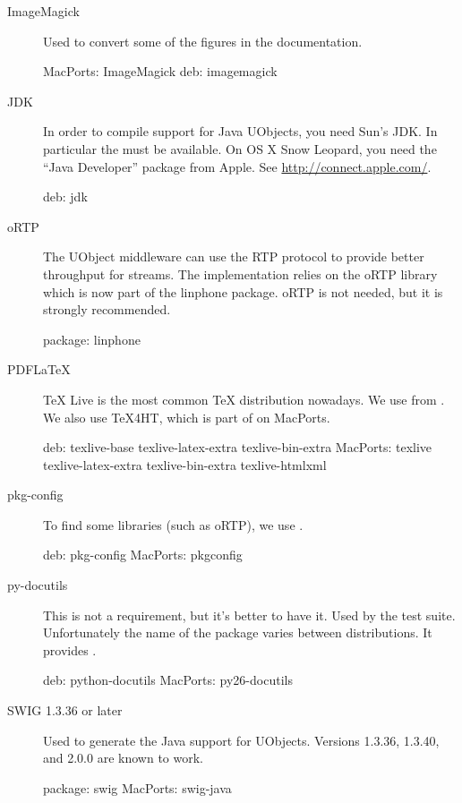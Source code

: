 \begin{description}
\item[ImageMagick] Used to convert some of the figures in the
  documentation.
\begin{package}
MacPorts: ImageMagick
deb: imagemagick
\end{package}

\item[JDK] In order to compile support for Java UObjects, you need Sun's
  JDK.  In particular the  must be available.  On OS X Snow
  Leopard, you need the ``Java Developer'' package from Apple.  See
  \url{http://connect.apple.com/}.
\begin{package}
deb: jdk
\end{package}

\item[oRTP] The UObject middleware can use the RTP protocol to provide
  better throughput for streams.  The implementation relies on the oRTP
  library which is now part of the linphone package.  oRTP is not needed,
  but it is strongly recommended.
\begin{package}
package: linphone
\end{package}

\item[PDFLaTeX] TeX Live is the most common \TeX{} distribution nowadays.
  We use  from .  We also use
  TeX4HT, which is part of  on MacPorts.
\begin{package}
deb: texlive-base texlive-latex-extra texlive-bin-extra
MacPorts: texlive texlive-latex-extra texlive-bin-extra texlive-htmlxml
\end{package}

\item[pkg-config] To find some libraries (such as oRTP), we use
  .
\begin{package}
deb: pkg-config
MacPorts: pkgconfig
\end{package}

\item[py-docutils] This is not a requirement, but it's better to have
  it.  Used by the test suite.  Unfortunately the name of the package
  varies between distributions.  It provides .
\begin{package}
deb: python-docutils
MacPorts: py26-docutils
\end{package}

\item[SWIG 1.3.36 or later] Used to generate the Java support for UObjects.
  Versions 1.3.36, 1.3.40, and 2.0.0 are known to work.
\begin{package}
package: swig
MacPorts: swig-java
\end{package}


\end{description}
